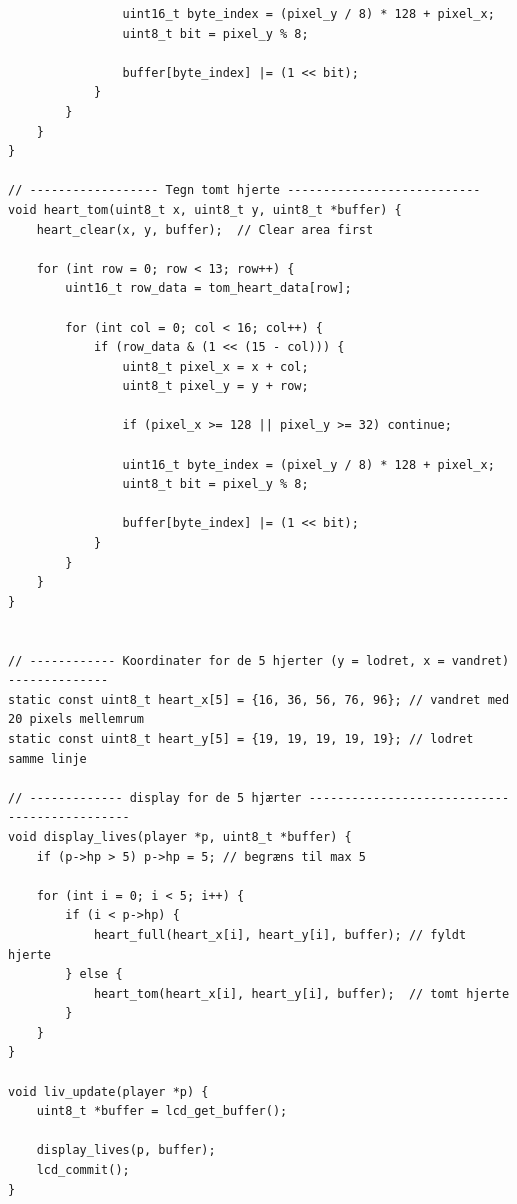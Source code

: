 \begin{lstlisting}
                uint16_t byte_index = (pixel_y / 8) * 128 + pixel_x;
                uint8_t bit = pixel_y % 8;

                buffer[byte_index] |= (1 << bit);
            }
        }
    }
}

// ------------------ Tegn tomt hjerte ---------------------------
void heart_tom(uint8_t x, uint8_t y, uint8_t *buffer) {
    heart_clear(x, y, buffer);  // Clear area first
    
    for (int row = 0; row < 13; row++) {
        uint16_t row_data = tom_heart_data[row];

        for (int col = 0; col < 16; col++) {
            if (row_data & (1 << (15 - col))) {
                uint8_t pixel_x = x + col;
                uint8_t pixel_y = y + row;

                if (pixel_x >= 128 || pixel_y >= 32) continue;

                uint16_t byte_index = (pixel_y / 8) * 128 + pixel_x;
                uint8_t bit = pixel_y % 8;

                buffer[byte_index] |= (1 << bit);
            }
        }
    }
}


// ------------ Koordinater for de 5 hjerter (y = lodret, x = vandret) -------------- 
static const uint8_t heart_x[5] = {16, 36, 56, 76, 96}; // vandret med 20 pixels mellemrum
static const uint8_t heart_y[5] = {19, 19, 19, 19, 19}; // lodret samme linje

// ------------- display for de 5 hjærter ---------------------------------------------
void display_lives(player *p, uint8_t *buffer) {
    if (p->hp > 5) p->hp = 5; // begræns til max 5

    for (int i = 0; i < 5; i++) {
        if (i < p->hp) {
            heart_full(heart_x[i], heart_y[i], buffer); // fyldt hjerte
        } else {
            heart_tom(heart_x[i], heart_y[i], buffer);  // tomt hjerte
        }
    }
}

void liv_update(player *p) {
    uint8_t *buffer = lcd_get_buffer();

    display_lives(p, buffer);
    lcd_commit();
}
\end{lstlisting}


